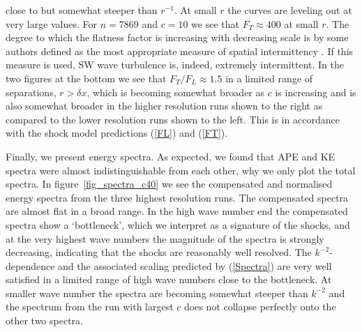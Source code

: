 close to but somewhat steeper than $ r^{-1} $. At small $ r $ the curves are
leveling out at very large values. For $ n = 7869 $ and $ c = 10 $ we see that
$ F_{T} \approx 400 $ at small $ r $. The degree to which the flatness factor
is increasing with decreasing scale is by some authors defined as the most
appropriate measure of spatial intermittency \cite[see for example][]{Frisch}.
If this measure is used, SW wave turbulence is, indeed, extremely intermittent.
In the two figures at the bottom we see that $ F_{T}/F_{L} \approx 1.5 $ in a
limited range of separations, $ r > \delta x $, which is becoming somewhat
broader as $ c $ is increasing and is also somewhat broader in the higher
resolution runs shown to the right as compared to the lower resolution runs
shown to the left. This is in accordance with the shock model predictions
(\ref{FL}) and (\ref{FT}).

Finally, we present energy spectra. As expected, we found that APE and KE
spectra were almost indistinguishable from each other, why we only plot the
total spectra. In figure~\ref{fig_spectra_c40} we see the compensated and
normalised energy spectra from the three highest resolution runs. The
compensated spectra are almost flat in a broad range. In the high wave number
end the compensated spectra show a `bottleneck', which we interpret as a
signature of the shocks, and at the very highest wave numbers the magnitude of
the spectra is strongly decreasing, indicating that the shocks are reasonably
well resolved. The $ k^{-2} $-dependence and the associated scaling predicted
by (\ref{Spectra}) are very well satisfied in a limited range of high wave
numbers close to the bottleneck. At smaller wave number the spectra are
becoming somewhat steeper than $ k^{-2} $ and the spectrum from the run with
largest $ c $ does not collapse perfectly onto the other two spectra.

